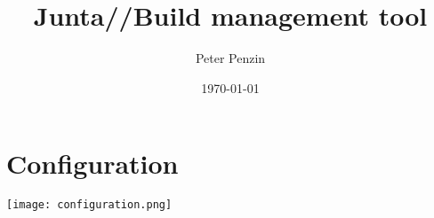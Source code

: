 \documentclass[11pt]{article}
\title{Junta//Build management tool}
\author{Peter Penzin}
\date{\today}
\begin{document}
\maketitle

\section{Configuration}
\texttt{[image: configuration.png]}
\end{document}
